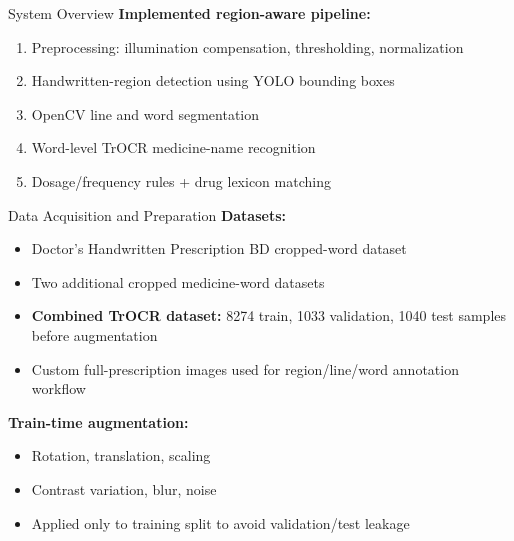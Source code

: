 \documentclass{beamer}
\begin{document}
\begin{frame}{System Overview}
\textbf{Implemented region-aware pipeline:}
\begin{enumerate}
    \item Preprocessing: illumination compensation, thresholding, normalization
    \item Handwritten-region detection using YOLO bounding boxes
    \item OpenCV line and word segmentation
    \item Word-level TrOCR medicine-name recognition~\cite{mishra2022trocr}
    \item Dosage/frequency rules + drug lexicon matching
\end{enumerate}

\vspace{0.25cm}
\centering
{}
\end{frame}

\begin{frame}{Data Acquisition and Preparation}
\textbf{Datasets:}
\begin{itemize}
    \item Doctor's Handwritten Prescription BD cropped-word dataset
    \item Two additional cropped medicine-word datasets
    \item \textbf{Combined TrOCR dataset:} 8274 train, 1033 validation, 1040 test samples before augmentation
    \item Custom full-prescription images used for region/line/word annotation workflow
\end{itemize}

\textbf{Train-time augmentation:}
\begin{itemize}
    \item Rotation, translation, scaling
    \item Contrast variation, blur, noise
    \item Applied only to training split to avoid validation/test leakage
\end{itemize}
\end{frame}
\end{document}
